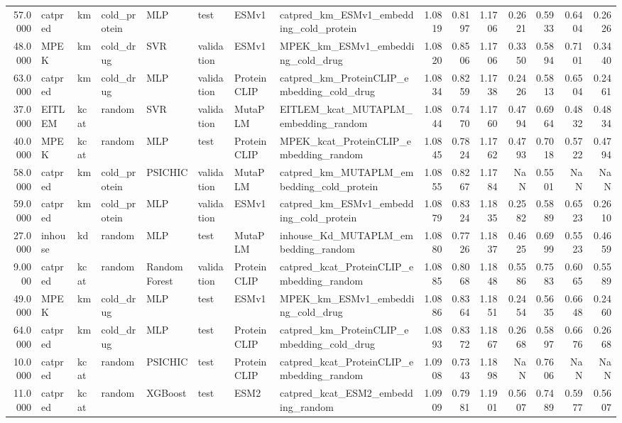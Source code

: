 \begin{tabular}{rlllllllrrrrrrr}
57.0000 & catpred & km & cold_protein & MLP & test & ESMv1 & catpred_km_ESMv1_embedding_cold_protein & 1.0819 & 0.8197 & 1.1706 & 0.2621 & 0.5933 & 0.6404 & 0.2626 \\
48.0000 & MPEK & km & cold_drug & SVR & validation & ESMv1 & MPEK_km_ESMv1_embedding_cold_drug & 1.0820 & 0.8506 & 1.1706 & 0.3350 & 0.5894 & 0.7101 & 0.3440 \\
63.0000 & catpred & km & cold_drug & MLP & validation & ProteinCLIP & catpred_km_ProteinCLIP_embedding_cold_drug & 1.0834 & 0.8259 & 1.1738 & 0.2426 & 0.5813 & 0.6504 & 0.2461 \\
37.0000 & EITLEM & kcat & random & SVR & validation & MutaPLM & EITLEM_kcat_MUTAPLM_embedding_random & 1.0844 & 0.7470 & 1.1760 & 0.4794 & 0.6964 & 0.4832 & 0.4834 \\
40.0000 & MPEK & kcat & random & MLP & test & ProteinCLIP & MPEK_kcat_ProteinCLIP_embedding_random & 1.0845 & 0.7824 & 1.1762 & 0.4793 & 0.7018 & 0.5722 & 0.4794 \\
58.0000 & catpred & km & cold_protein & PSICHIC & validation & MutaPLM & catpred_km_MUTAPLM_embedding_cold_protein & 1.0855 & 0.8267 & 1.1784 & NaN & 0.5501 & NaN & NaN \\
59.0000 & catpred & km & cold_protein & MLP & validation & ESMv1 & catpred_km_ESMv1_embedding_cold_protein & 1.0879 & 0.8324 & 1.1835 & 0.2582 & 0.5889 & 0.6523 & 0.2610 \\
27.0000 & inhouse & kd & random & MLP & test & MutaPLM & inhouse_Kd_MUTAPLM_embedding_random & 1.0880 & 0.7726 & 1.1837 & 0.4625 & 0.6999 & 0.5523 & 0.4659 \\
9.0000 & catpred & kcat & random & Random Forest & validation & ProteinCLIP & catpred_kcat_ProteinCLIP_embedding_random & 1.0885 & 0.8068 & 1.1848 & 0.5586 & 0.7583 & 0.6065 & 0.5589 \\
49.0000 & MPEK & km & cold_drug & MLP & test & ESMv1 & MPEK_km_ESMv1_embedding_cold_drug & 1.0886 & 0.8364 & 1.1851 & 0.2454 & 0.5635 & 0.6648 & 0.2460 \\
64.0000 & catpred & km & cold_drug & MLP & test & ProteinCLIP & catpred_km_ProteinCLIP_embedding_cold_drug & 1.0893 & 0.8372 & 1.1867 & 0.2668 & 0.5897 & 0.6676 & 0.2668 \\
10.0000 & catpred & kcat & random & PSICHIC & test & ProteinCLIP & catpred_kcat_ProteinCLIP_embedding_random & 1.0908 & 0.7343 & 1.1898 & NaN & 0.7606 & NaN & NaN \\
11.0000 & catpred & kcat & random & XGBoost & test & ESM2 & catpred_kcat_ESM2_embedding_random & 1.0909 & 0.7981 & 1.1901 & 0.5607 & 0.7489 & 0.5977 & 0.5607 \\

\end{tabular}
